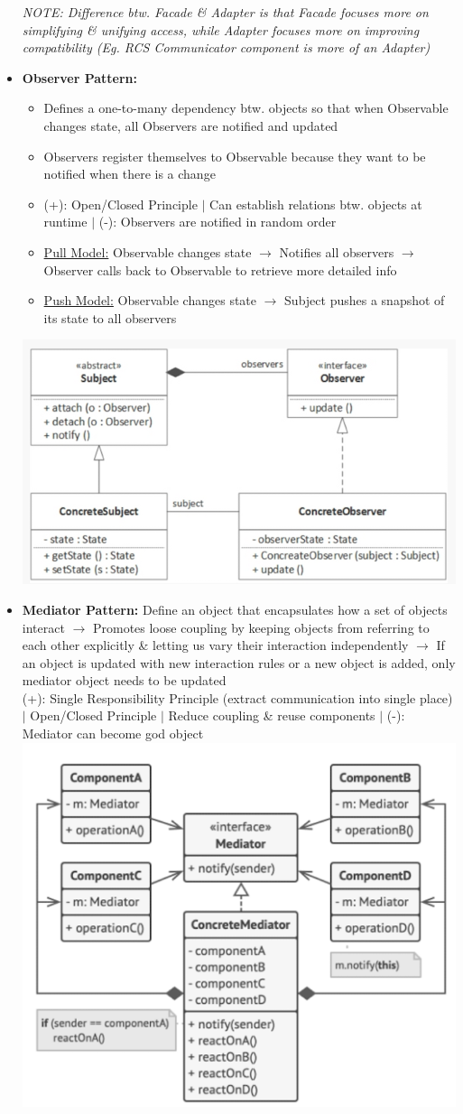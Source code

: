 \documentclass[landscape]{article}
\begin{document}
\begin{multicols*}{5}
\begin{itemize}
      \textit{NOTE: Difference btw. Facade \& Adapter is that Facade focuses more on simplifying \& unifying access, while Adapter focuses more on improving compatibility (Eg. RCS Communicator component is more of an Adapter)}
      \item \textbf{Observer Pattern:}
      \begin{itemize}
        \item Defines a one-to-many dependency btw. objects so that when Observable changes state, all Observers are notified and updated
        \item Observers register themselves to Observable because they want to be notified when there is a change
        \item (+): Open/Closed Principle $|$ Can establish relations btw. objects at runtime $|$ (-): Observers are notified in random order
        \item \underline{Pull Model:} Observable changes state $\rightarrow$ Notifies all observers $\rightarrow$ Observer calls back to Observable to retrieve more detailed info
        \item \underline{Push Model:} Observable changes state $\rightarrow$ Subject pushes a snapshot of its state to all observers
      \end{itemize}
      \includegraphics[width=0.65\linewidth]{13_observer_pattern.png}
      \item \textbf{Mediator Pattern:} Define an object that encapsulates how a set of objects interact $\rightarrow$ Promotes loose coupling by keeping objects from referring to each other explicitly \& letting us vary their interaction independently $\rightarrow$ If an object is updated with new interaction rules or a new object is added, only mediator object needs to be updated \\
      (+): Single Responsibility Principle (extract communication into single place) $|$ Open/Closed Principle $|$ Reduce coupling \& reuse components $|$ (-): Mediator can become god object
      \includegraphics[width=0.65\linewidth]{14_mediator_pattern.png}

\end{itemize}
\end{multicols*}
\end{document}
